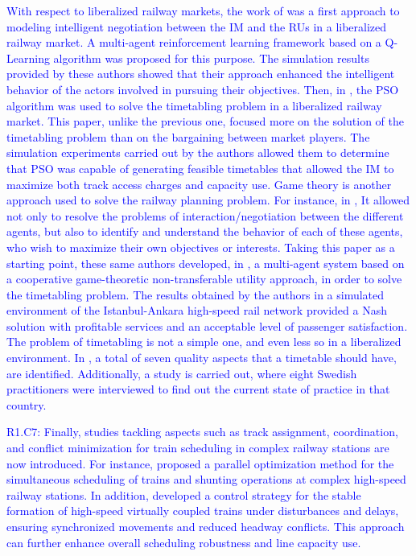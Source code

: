 \documentclass[Afour,sagev,times]{sagej}
\newcommand{\primero}[1]{\textcolor{blue}{#1}}
\begin{document}
\primero{With respect to liberalized railway markets, the work of \cite{Wong10} was a first approach to modeling intelligent negotiation between the \gls{IM} and the \glspl{RU} in a liberalized railway market. A multi-agent reinforcement learning framework based on a Q-Learning algorithm was proposed for this purpose. The simulation results provided by these authors showed that their approach enhanced the intelligent behavior of the actors involved in pursuing their objectives. Then, in \cite{Ho12}, the \gls{PSO} algorithm was used to solve the timetabling problem in a liberalized railway market. This paper, unlike the previous one, focused more on the solution of the timetabling problem than on the bargaining between market players. The simulation experiments carried out by the authors allowed them to determine that \gls{PSO} was capable of generating feasible timetables that allowed the \gls{IM} to maximize both track access charges and capacity use. Game theory is another approach used to solve the railway planning problem. For instance, in \cite{Shakibaei19}, It allowed not only to resolve the problems of interaction/negotiation between the different agents, but also to identify and understand the behavior of each of these agents, who wish to maximize their own objectives or interests. Taking this paper as a starting point, these same authors developed, in \cite{Shakibaei21}, a multi-agent system based on a cooperative game-theoretic non-transferable utility approach, in order to solve the timetabling problem. The results obtained by the authors in a simulated environment of the Istanbul-Ankara high-speed rail network provided a Nash solution with profitable services and an acceptable level of passenger satisfaction. The problem of timetabling is not a simple one, and even less so in a liberalized environment. In \cite{Gestrelius20}, a total of seven quality aspects that a timetable should have, are identified. Additionally, a study is carried out, where eight Swedish practitioners were interviewed to find out the current state of practice in that country.}

\primero{R1.C7: Finally, studies tackling aspects such as track assignment, coordination, and conflict minimization for train scheduling in complex railway stations are now introduced. For instance, \cite{Zhong24} proposed a parallel optimization method for the simultaneous scheduling of trains and shunting operations at complex high-speed railway stations. In addition, \cite{Liu23} developed a control strategy for the stable formation of high-speed virtually coupled trains under disturbances and delays, ensuring synchronized movements and reduced headway conflicts. This approach can further enhance overall scheduling robustness and line capacity use.}
\end{document}
